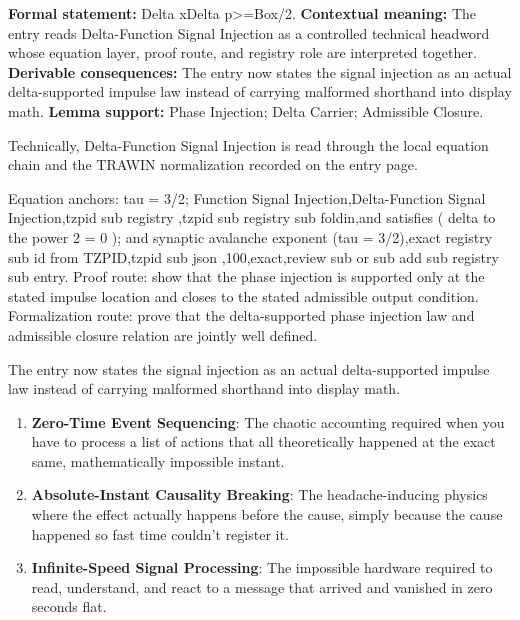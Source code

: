 \begingroup\footnotesize\setlength{\emergencystretch}{3em}\sloppy
\textbf{Formal statement:} Delta xDelta p>=Box/2. \textbf{Contextual meaning:} The entry reads Delta-Function Signal Injection as a controlled technical headword whose equation layer, proof route, and registry role are interpreted together. \textbf{Derivable consequences:} The entry now states the signal injection as an actual delta-supported impulse law instead of carrying malformed shorthand into display math. \textbf{Lemma support:} Phase Injection; Delta Carrier; Admissible Closure.\par
\endgroup

Technically, Delta-Function Signal Injection is read through the local equation chain and the TRAWIN normalization recorded on the entry page.

Equation anchors: tau = 3/2; Function Signal Injection,Delta-Function Signal Injection,tzpid sub registry ,tzpid sub registry sub foldin,and satisfies ( delta to the power 2 = 0 ); and synaptic avalanche exponent (tau = 3/2),exact registry sub id from TZPID,tzpid sub json ,100,exact,review sub or sub add sub registry sub entry. Proof route: show that the phase injection is supported only at the stated impulse location and closes to the stated admissible output condition. Formalization route: prove that the delta-supported phase injection law and admissible closure relation are jointly well defined.

The entry now states the signal injection as an actual delta-supported impulse law instead of carrying malformed shorthand into display math.
\endgroup

\begin{enumerate}[leftmargin=1.6em,itemsep=6pt,topsep=4pt]
\item \textbf{Zero-Time Event Sequencing}: The chaotic accounting required when you have to process a list of actions that all theoretically happened at the exact same, mathematically impossible instant.
\item \textbf{Absolute-Instant Causality Breaking}: The headache-inducing physics where the effect actually happens before the cause, simply because the cause happened so fast time couldn't register it.
\item \textbf{Infinite-Speed Signal Processing}: The impossible hardware required to read, understand, and react to a message that arrived and vanished in zero seconds flat.
\end{enumerate}

